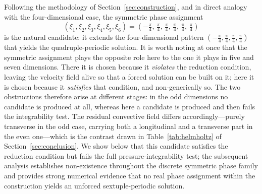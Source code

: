 \documentclass[11pt]{jfm}
\numberwithin{equation}{section}
\begin{document}
Following the methodology of Section~\ref{sec:construction}, and in direct analogy with the
four-dimensional case, the symmetric phase assignment
\begin{equation}
\label{6.2}
(\xi_1, \xi_2, \xi_3, \xi_4, \xi_5, \xi_6) = \left(-\tfrac{\pi}{4},\, \tfrac{\pi}{4},\, \tfrac{\pi}{4},\, \tfrac{\pi}{4},\, \tfrac{\pi}{4},\, \tfrac{\pi}{4}\right)
\end{equation}
is the natural candidate: it extends the four-dimensional pattern $(-\tfrac{\pi}{4},\tfrac{\pi}{4},\tfrac{\pi}{4},\tfrac{\pi}{4})$ that yields the quadruple-periodic solution. It is worth noting at once that the symmetric assignment plays the
opposite role here to the one it plays in five and seven dimensions. There it is chosen because it
\emph{violates} the reduction condition, leaving the velocity field alive so that a forced solution
can be built on it; here it is chosen because it \emph{satisfies} that condition, and
non-generically so. The two obstructions therefore arise at different stages: in the odd dimensions
no candidate is produced at all, whereas here a candidate is produced and then fails the
integrability test. The residual convective field differs accordingly---purely transverse in the
odd case, carrying both a longitudinal and a transverse part in the even one---which is the
contrast drawn in Table~\ref{tab:helmholtz} of Section~\ref{sec:conclusion}. We show below that this candidate satisfies the reduction
condition but fails the full pressure-integrability test; the subsequent analysis
establishes non-existence throughout the discrete symmetric phase family and provides strong
numerical evidence that no real phase assignment within the construction yields an unforced
sextuple-periodic solution.
\end{document}
